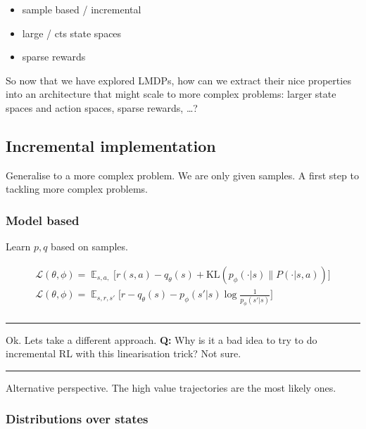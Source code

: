 \begin{itemize}
\tightlist
\item
  sample based / incremental
\item
  large / cts state spaces
\item
  sparse rewards
\end{itemize}

So now that we have explored LMDPs, how can we extract their nice
properties into an architecture that might scale to more complex
problems: larger state spaces and action spaces, sparse rewards,
\ldots{}?

\subsection{Incremental implementation}

Generalise to a more complex problem. We are only given samples. A first
step to tackling more complex problems.


\subsubsection{Model based}

Learn \(p, q\) based on samples.

\begin{align}
\mathcal L(\theta, \phi) = \mathop{\mathbb E}_{s, a,} \bigg[ r(s, a) - q_\theta(s) + \text{KL}(p_\phi(\cdot | s) \parallel P(\cdot | s, a)) \bigg]\\
\mathcal L(\theta, \phi) = \mathop{\mathbb E}_{s, r, s'} \bigg[r - q_\theta(s) - p_\phi(s' | s) \log \frac{1}{ p_\phi(s' | s)} \bigg] \\
\end{align}

\begin{center}\rule{0.5\linewidth}{\linethickness}\end{center}

Ok. Lets take a different approach. \textbf{Q:} Why is it a bad idea to
try to do incremental RL with this linearisation trick? Not sure.

\begin{center}\rule{0.5\linewidth}{\linethickness}\end{center}

Alternative perspective. The high value trajectories are the most likely
ones.

\subsubsection{Distributions over states}

